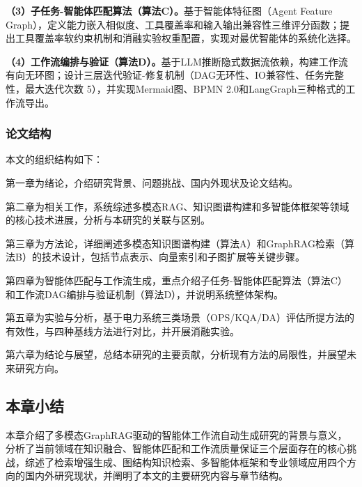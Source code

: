 \textbf{（3）子任务-智能体匹配算法（算法C）。}基于智能体特征图（Agent Feature Graph），定义能力嵌入相似度、工具覆盖率和输入输出兼容性三维评分函数；提出工具覆盖率软约束机制和消融实验权重配置，实现对最优智能体的系统化选择。

\textbf{（4）工作流编排与验证（算法D）。}基于LLM推断隐式数据流依赖，构建工作流有向无环图；设计三层迭代验证-修复机制（DAG无环性、IO兼容性、任务完整性，最大迭代次数 5），并实现Mermaid图、BPMN 2.0和LangGraph三种格式的工作流导出。

\subsubsection{论文结构}

本文的组织结构如下：

第一章为绪论，介绍研究背景、问题挑战、国内外现状及论文结构。

第二章为相关工作，系统综述多模态RAG、知识图谱构建和多智能体框架等领域的核心技术进展，分析与本研究的关联与区别。

第三章为方法论，详细阐述多模态知识图谱构建（算法A）和GraphRAG检索（算法B）的技术设计，包括节点表示、向量索引和子图扩展等关键步骤。

第四章为智能体匹配与工作流生成，重点介绍子任务-智能体匹配算法（算法C）和工作流DAG编排与验证机制（算法D），并说明系统整体架构。

第五章为实验与分析，基于电力系统三类场景（OPS/KQA/DA）评估所提方法的有效性，与四种基线方法进行对比，并开展消融实验。

第六章为结论与展望，总结本研究的主要贡献，分析现有方法的局限性，并展望未来研究方向。

\subsection{本章小结}

本章介绍了多模态GraphRAG驱动的智能体工作流自动生成研究的背景与意义，分析了当前领域在知识融合、智能体匹配和工作流质量保证三个层面存在的核心挑战，综述了检索增强生成、图结构知识检索、多智能体框架和专业领域应用四个方向的国内外研究现状，并阐明了本文的主要研究内容与章节结构。
